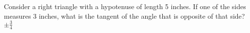 {Consider a right triangle with a hypotenuse of length 5 inches. If one of the sides measures 3 inches, what is the tangent of the angle that is opposite of that side?}
{$\pm\frac{3}{4}$}
